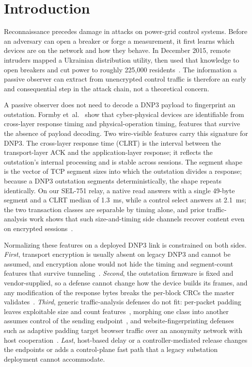\section{Introduction}
\label{sec:intro}

Reconnaissance precedes damage in attacks on power-grid control systems. Before an adversary can
open a breaker or forge a measurement, it first learns which devices are on the network and how they
behave. In December 2015, remote intruders mapped a Ukrainian distribution utility, then used that
knowledge to open breakers and cut power to roughly 225{,}000 residents~\cite{ukraine2015}. The
information a passive observer can extract from unencrypted control traffic is therefore an early and
consequential step in the attack chain, not a theoretical concern.

A passive observer does not need to decode a DNP3 payload to fingerprint an outstation. Formby
et~al.~\cite{formby2016} show that cyber-physical devices are identifiable from cross-layer response
timing and physical-operation timing, features that survive the absence of payload decoding. Two
wire-visible features carry this signature for DNP3. The cross-layer response time (CLRT) is the
interval between the transport-layer ACK and the application-layer response; it reflects the
outstation's internal processing and is stable across sessions. The segment shape is the vector of
TCP segment sizes into which the outstation divides a response; because a DNP3 outstation segments
deterministically, the shape repeats identically. On our SEL-751 relay, a native read answers with a
single 49-byte segment and a CLRT median of 1.3~ms, while a control select answers at 2.1~ms; the two
transaction classes are separable by timing alone, and prior traffic-analysis work shows that such
size-and-timing side channels recover content even on encrypted sessions~\cite{sirinam2018}.

Normalizing these features on a deployed DNP3 link is constrained on both sides. \emph{First},
transport encryption is usually absent on legacy DNP3 and cannot be assumed, and encryption alone
would not hide the timing and segment-count features that survive tunneling~\cite{sirinam2018}.
\emph{Second}, the outstation firmware is fixed and vendor-supplied, so a defense cannot change how
the device builds its frames, and any modification of the response bytes breaks the per-block CRCs the
master validates~\cite{dnp3std}. \emph{Third}, generic traffic-analysis defenses do not fit: per-packet
padding leaves exploitable size and count features~\cite{dyer2012}, morphing one class into another
assumes control of the sending endpoint~\cite{wright2009}, and website-fingerprinting defenses such as
adaptive padding target browser traffic over an anonymity network with host cooperation~\cite{juarez2016}.
\emph{Last}, host-based delay or a controller-mediated release changes the endpoints or adds a
control-plane fast path that a legacy substation deployment cannot accommodate.

